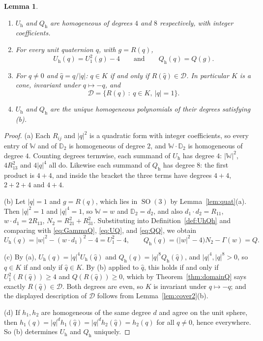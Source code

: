 \documentclass[reqno]{amsart}
\newtheorem{lemma}[theorem]{Lemma}
\theoremstyle{definition}
\DeclareMathOperator{\SO}{SO}
\newcommand{\Dom}{\mathcal{D}}
\begin{document}
\begin{lemma}\label{lem:homogQ}
\leavevmode
\begin{enumerate}[leftmargin=2.2em,label=(\alph*)]
\item $U_{\mathrm h}$ and $Q_{\mathrm h}$ are homogeneous of degrees $4$ and $8$ respectively, with
integer coefficients.
\item For every unit quaternion $q$, with $g=R(q)$,
\[
U_{\mathrm h}(q)=U_1^2(g)-4\qquad\text{and}\qquad Q_{\mathrm h}(q)=Q(g).
\]
\item For $q\ne0$ and $\hat q=q/|q|$: $q\in K$ if and only if $R(\hat q)\in\Dom$. In particular
$K$ is a cone, invariant under $q\mapsto-q$, and
\[
\Dom=\bigl\{R(q)\ :\ q\in K,\ |q|=1\bigr\}.
\]
\item $U_{\mathrm h}$ and $Q_{\mathrm h}$ are the \emph{unique}
homogeneous polynomials of their degrees satisfying (b).
\end{enumerate}
\end{lemma}
\begin{proof}
(a) Each $R_{ij}$ and $|q|^2$ is a quadratic form with integer coefficients, so every entry of
$\mathbb W$ and of $\mathbb D_2$ is homogeneous of degree $2$, and $\mathbb W\cdot\mathbb D_2$ is
homogeneous of degree $4$. Counting degrees termwise, each summand of $U_{\mathrm h}$ has degree
$4$: $|\mathbb W|^2$, $4R_{13}^2$ and $4|q|^4$ all do. Likewise each summand of $Q_{\mathrm h}$ has
degree $8$: the first product is $4+4$, and inside the bracket the three terms have degrees
$4+4$, $2+2+4$ and $4+4$.

(b) Let $|q|=1$ and $g=R(q)$, which lies in $\SO(3)$ by Lemma~\ref{lem:quat}(a). Then $|q|^2=1$ and
$|q|^4=1$, so $\mathbb W=w$ and $\mathbb D_2=d_2$, and also $d_1\cdot d_2=R_{11}$,
$w\cdot d_1=2R_{13}$, $N_2=R_{21}^2+R_{31}^2$. Substituting into
Definition~\ref{def:UhQh} and comparing with \eqref{eq:GammaQ}, \eqref{eq:UQ}, and \eqref{eq:QQ}, we obtain
\[
U_{\mathrm h}(q)=|w|^2-(w\cdot d_1)^2-4=U_1^2-4,
\qquad
Q_{\mathrm h}(q)=\bigl(|w|^2-4\bigr)N_2-\Gamma(w)=Q .
\]

(c) By (a), $U_{\mathrm h}(q)=|q|^4U_{\mathrm h}(\hat q)$ and
$Q_{\mathrm h}(q)=|q|^8Q_{\mathrm h}(\hat q)$, and $|q|^4,|q|^8>0$, so $q\in K$ if and only if
$\hat q\in K$. By (b) applied to $\hat q$, this holds if and only if $U_1^2(R(\hat q))\ge4$ and
$Q(R(\hat q))\ge0$, which by Theorem~\ref{thm:domainQ} says exactly $R(\hat q)\in\Dom$. Both
degrees are even, so $K$ is invariant under $q\mapsto-q$; and the displayed description of $\Dom$
follows from Lemma~\ref{lem:cover2}(b).

(d)  If $h_1,h_2$ are homogeneous of the same degree $d$ and agree on the
unit sphere, then $h_1(q)=|q|^d h_1(\hat q)=|q|^d h_2(\hat q)=h_2(q)$ for
all $q\ne0$, hence everywhere. So (b) determines $U_{\mathrm h}$ and
$Q_{\mathrm h}$ uniquely.
\end{proof}
\end{document}
